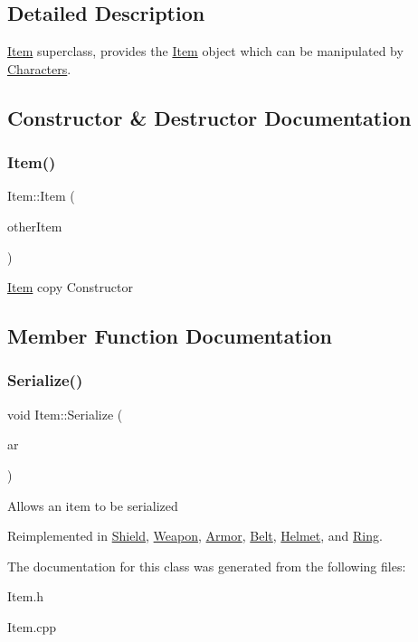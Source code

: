 \subsection{Detailed Description}
\hyperlink{class_item}{Item} superclass, provides the \hyperlink{class_item}{Item} object which can be manipulated by \hyperlink{class_characters}{Characters}. 

\subsection{Constructor \& Destructor Documentation}
\hypertarget{class_item_a2f0671713504024a4b63cd63c835f759}{}\label{class_item_a2f0671713504024a4b63cd63c835f759} 
\subsubsection{\texorpdfstring{Item()}{Item()}}
{\footnotesize\ttfamily Item\+::\+Item (\begin{DoxyParamCaption}\item[{const \hyperlink{class_item}{Item} $\ast$}]{other\+Item }\end{DoxyParamCaption})}

\hyperlink{class_item}{Item} copy Constructor 

\subsection{Member Function Documentation}
\hypertarget{class_item_ad1eae21e57fc3ce3252080a4efbfb8e8}{}\label{class_item_ad1eae21e57fc3ce3252080a4efbfb8e8} 
\subsubsection{\texorpdfstring{Serialize()}{Serialize()}}
{\footnotesize\ttfamily void Item\+::\+Serialize (\begin{DoxyParamCaption}\item[{C\+Archive \&}]{ar }\end{DoxyParamCaption})\hspace{0.3cm}{\ttfamily [virtual]}}

Allows an item to be serialized 

Reimplemented in \hyperlink{class_shield_a8d045c43b16aab5fc474e696cb8a7f1f}{Shield}, \hyperlink{class_weapon_a1c30e8f2add0a1aa8558cfbff13ad728}{Weapon}, \hyperlink{class_armor_a49d9af5d1a2d02e9dbf05d023f4a6515}{Armor}, \hyperlink{class_belt_a39c1f664a2f79f5dedac37546563f493}{Belt}, \hyperlink{class_helmet_abb01d02590723236e9cf9e260824e712}{Helmet}, and \hyperlink{class_ring_a123e40607e2aa46b27da2228af73eb4a}{Ring}.



The documentation for this class was generated from the following files\+:\begin{DoxyCompactItemize}
\item 
Item.\+h\item 
Item.\+cpp\end{DoxyCompactItemize}
